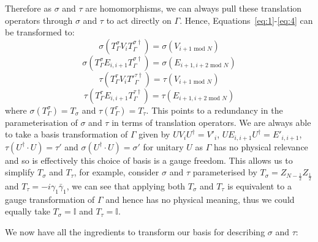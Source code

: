 \documentclass{article}
\begin{document}
Therefore as $\sigma$ and $\tau$ are homomorphisms, we can always pull these translation operators through $\sigma$ and $\tau$ to act directly on $\Gamma$. Hence, Equations~\eqref{eq:1}-\eqref{eq:4} can be transformed to:
\begin{equation}
    \sigma(T^{\sigma}_{\Gamma}V_iT^{\sigma\dagger}_{\Gamma}) = \sigma(V_{i+1 \text{ mod }N})
\end{equation}
\begin{equation}
\sigma(T^{\sigma}_{\Gamma}E_{i,i+1}T^{\sigma\dagger}_{\Gamma}) = \sigma(E_{i+1,i+2 \text{ mod }N})
\end{equation}
\begin{equation}
\tau(T^{\tau}_{\Gamma}V_iT'^{\tau\dagger}_{\Gamma}) = \tau(V_{i+1 \text{ mod }N})
\end{equation}
\begin{equation}
\tau(T^{\tau}_{\Gamma}E_{i,i+1}T^{\tau\dagger}_{\Gamma})  = \tau(E_{i+1,i+2 \text{ mod }N})
\end{equation}
where $\sigma(T^{\sigma}_{\Gamma}) = T_{\sigma}$ and $\tau(T^{\tau}_{\Gamma}) = T_{\tau}$. This points to a redundancy in the parameterisation of $\sigma$ and $\tau$ in terms of translation operators. We are always able to take a basis transformation of $\Gamma$ given by $UV_i U^{\dagger} = V'_i$, $UE_{i,i+1} U^{\dagger} = E'_{i,i+1}$, $\tau(U^{\dagger}\cdot U) = \tau'$ and $\sigma (U^{\dagger} \cdot U) = \sigma'$ for unitary $U$ as $\Gamma$ has no physical relevance and so is effectively this choice of basis is a gauge freedom. This allows us to simplify $T_{\sigma}$ and $T_{\tau}$, for example, consider $\sigma$ and $\tau$ parameterised by $T_{\sigma} = Z_{N-\frac{1}{2}}Z_{\frac{1}{2}}$ and $T_{\tau} = -i\gamma_1 \bar{\gamma}_1$, we can see that applying both $T_{\sigma}$ and $T_{\tau}$ is equivalent to a gauge transformation of $\Gamma$ and hence has no physical meaning, thus we could equally take  $T_{\sigma} = \mathbb{I}$ and $T_{\tau} = \mathbb{I}$.

We now have all the ingredients to transform our basis for describing $\sigma$ and $\tau$:
\end{document}
